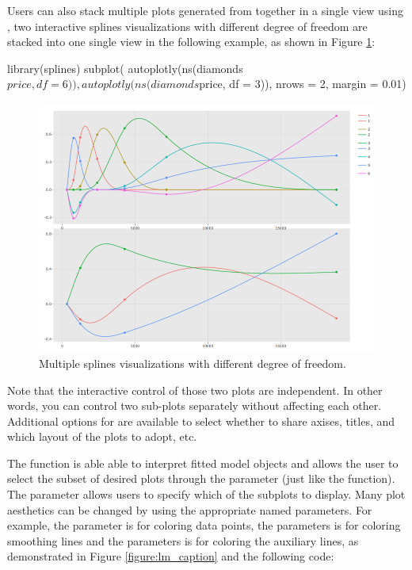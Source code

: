 Users can also stack multiple plots generated from 
together in a single view using , two interactive
splines visualizations with different degree of freedom are stacked into
one single view in the following example, as shown in Figure
\ref{figure:splines_subplot}:

\begin{Schunk}
\begin{Sinput}
library(splines)
subplot(
  autoplotly(ns(diamonds$price, df = 6)),
  autoplotly(ns(diamonds$price, df = 3)), nrows = 2, margin = 0.01)
\end{Sinput}
\end{Schunk}

\begin{figure}[htbp]
  \centering
  \includegraphics[width=145mm,scale=0.8]{images/splines_subplot.png}
  \caption{Multiple splines visualizations with different degree of freedom.}
  \label{figure:splines_subplot}
\end{figure}

Note that the interactive control of those two plots are independent. In
other words, you can control two sub-plots separately without affecting
each other. Additional options for  are available to
select whether to share axises, titles, and which layout of the plots to
adopt, etc.

The  function is able able to interpret 
fitted model objects and allows the user to select the subset of desired
plots through the  parameter (just like the 
function). The  parameter allows users to specify which of
the subplots to display. Many plot aesthetics can be changed by using
the appropriate named parameters. For example, the 
parameter is for coloring data points, the 
parameters is for coloring smoothing lines and the 
parameters is for coloring the auxiliary lines, as demonstrated in
Figure \ref{figure:lm_caption} and the following code:

